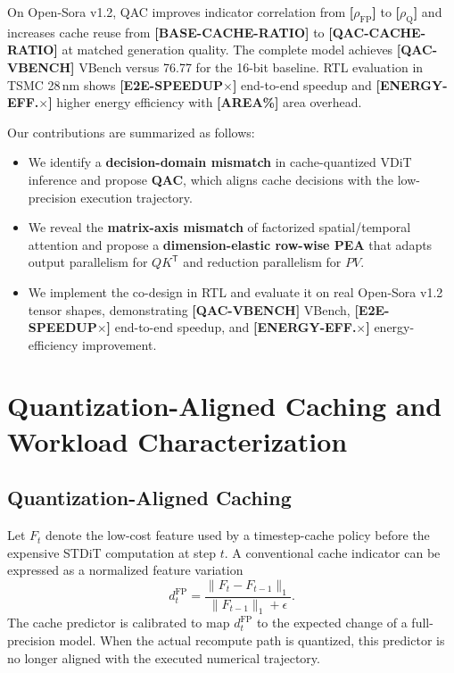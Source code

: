 \documentclass[conference]{IEEEtran}
\newcommand{\ModelName}{Open-Sora v1.2}
\newcommand{\BaselineVBench}{76.77}
\newcommand{\QACVBench}{\textbf{[QAC-VBENCH]}}
\newcommand{\FPIndicatorCorr}{\textbf{[$\rho_{\mathrm{FP}}$]}}
\newcommand{\QIndicatorCorr}{\textbf{[$\rho_{\mathrm{Q}}$]}}
\newcommand{\BaseCacheRatio}{\textbf{[BASE-CACHE-RATIO]}}
\newcommand{\QACCacheRatio}{\textbf{[QAC-CACHE-RATIO]}}
\newcommand{\TechNode}{TSMC 28\,nm}
\newcommand{\AreaOverhead}{\textbf{[AREA\%]}}
\newcommand{\EtoESpeedup}{\textbf{[E2E-SPEEDUP$\times$]}}
\newcommand{\EnergyGain}{\textbf{[ENERGY-EFF.$\times$]}}
\begin{document}
On \ModelName{}, QAC improves indicator correlation from \FPIndicatorCorr{}
to \QIndicatorCorr{} and increases cache reuse from \BaseCacheRatio{} to
\QACCacheRatio{} at matched generation quality. The complete model achieves
\QACVBench{} VBench versus \BaselineVBench{} for the 16-bit baseline. RTL
evaluation in \TechNode{} shows \EtoESpeedup{} end-to-end speedup and
\EnergyGain{} higher energy efficiency with \AreaOverhead{} area overhead.

Our contributions are summarized as follows:
\begin{itemize}
  \item We identify a \textbf{decision-domain mismatch} in cache-quantized
  VDiT inference and propose \textbf{QAC}, which aligns cache decisions with
  the low-precision execution trajectory.
  \item We reveal the \textbf{matrix-axis mismatch} of factorized
  spatial/temporal attention and propose a \textbf{dimension-elastic row-wise
  PEA} that adapts output parallelism for $QK^{\mathsf T}$ and reduction
  parallelism for $PV$.
  \item We implement the co-design in RTL and evaluate it on real
  \ModelName{} tensor shapes, demonstrating \QACVBench{} VBench,
  \EtoESpeedup{} end-to-end speedup, and \EnergyGain{} energy-efficiency
  improvement.
\end{itemize}


\section{Quantization-Aligned Caching and Workload Characterization}
\label{sec:characterization}

\subsection{Quantization-Aligned Caching}
\label{sec:qac}

Let $F_t$ denote the low-cost feature used by a timestep-cache policy before
the expensive STDiT computation at step $t$. A conventional cache indicator
can be expressed as a normalized feature variation
\begin{equation}
d_t^{\mathrm{FP}}=
\frac{\lVert F_t-F_{t-1}\rVert_1}
     {\lVert F_{t-1}\rVert_1+\epsilon}.
\label{eq:fp_indicator}
\end{equation}
The cache predictor is calibrated to map $d_t^{\mathrm{FP}}$ to the expected
change of a full-precision model. When the actual recompute path is quantized,
this predictor is no longer aligned with the executed numerical trajectory.
\end{document}
